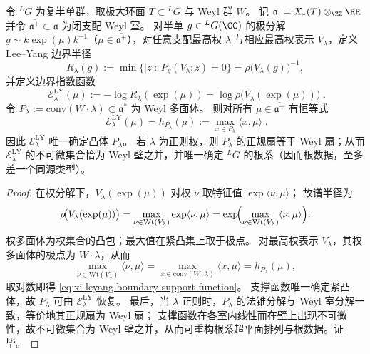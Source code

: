 \begin{theorem}\label{thm:xi-leyang-boundary-support-function-root-system}
令 \({}^{L}G\) 为复半单群，取极大环面 \(T\subset {}^{L}G\) 与 Weyl 群 \(W\)。
记
\(
\mathfrak a:=X_{\ast}(T)\otimes_{\ZZ}\RR
\)
并令 \(\overline{\mathfrak a^{+}}\subset\mathfrak a\) 为闭支配 Weyl 室。
对半单 \(g\in{}^{L}G(\CC)\) 的极分解 \(g\sim k\exp(\mu)k^{-1}\)（\(\mu\in\overline{\mathfrak a^{+}}\)），对任意支配最高权 \(\lambda\) 与相应最高权表示 \(V_{\lambda}\)，定义 Lee--Yang 边界半径
\[
R_{\lambda}(g):=\min\{|z|:\ P_g(V_{\lambda};z)=0\}
=\rho\!\bigl(V_{\lambda}(g)\bigr)^{-1},
\]
并定义边界指数函数
\begin{equation}\label{eq:xi-leyang-boundary-exponent}
\boxed{\;
\mathcal E^{\mathrm{LY}}_{\lambda}(\mu)
:=-\log R_{\lambda}(\exp(\mu))
=\log \rho\!\bigl(V_{\lambda}(\exp(\mu))\bigr)\; }.
\end{equation}
令 \(P_{\lambda}:=\mathrm{conv}(W\cdot \lambda)\subset \mathfrak a^{\ast}\) 为 Weyl 多面体。
则对所有 \(\mu\in\overline{\mathfrak a^{+}}\) 有恒等式
\begin{equation}\label{eq:xi-leyang-boundary-support-function}
\boxed{\;
\mathcal E^{\mathrm{LY}}_{\lambda}(\mu)=h_{P_{\lambda}}(\mu)
:=\max_{x\in P_{\lambda}}\langle x,\mu\rangle\; }.
\end{equation}
因此 \(\mathcal E^{\mathrm{LY}}_{\lambda}\) 唯一确定凸体 \(P_{\lambda}\)。
若 \(\lambda\) 为正则权，则 \(P_{\lambda}\) 的正规扇等于 Weyl 扇；从而 \(\mathcal E^{\mathrm{LY}}_{\lambda}\) 的不可微集合恰为 Weyl 壁之并，并唯一确定 \({}^{L}G\) 的根系（因而根数据，至多差一个同源类型）。
\end{theorem}
\begin{proof}
在权分解下，\(V_{\lambda}(\exp(\mu))\) 对权 \(\nu\) 取特征值 \(\exp\langle \nu,\mu\rangle\)；
故谱半径为
\[
\rho\!\bigl(V_{\lambda}(\exp(\mu))\bigr)
=\max_{\nu\in\mathrm{Wt}(V_{\lambda})}\exp\langle\nu,\mu\rangle
=\exp\!\Bigl(\max_{\nu\in\mathrm{Wt}(V_{\lambda})}\langle\nu,\mu\rangle\Bigr).
\]
权多面体为权集合的凸包；最大值在紧凸集上取于极点。
对最高权表示 \(V_{\lambda}\)，其权多面体的极点为 \(W\cdot\lambda\)，从而
\[
\max_{\nu\in\mathrm{Wt}(V_{\lambda})}\langle\nu,\mu\rangle
=\max_{x\in\mathrm{conv}(W\cdot\lambda)}\langle x,\mu\rangle
=h_{P_{\lambda}}(\mu),
\]
取对数即得 \eqref{eq:xi-leyang-boundary-support-function}。
支撑函数唯一确定紧凸体，故 \(P_{\lambda}\) 可由 \(\mathcal E^{\mathrm{LY}}_{\lambda}\) 恢复。
最后，当 \(\lambda\) 正则时，\(P_{\lambda}\) 的法锥分解与 Weyl 室分解一致，等价地其正规扇为 Weyl 扇；
支撑函数在各室内线性而在壁上出现不可微性，故不可微集合为 Weyl 壁之并，从而可重构根系超平面排列与根数据。证毕。
\end{proof}

\endinput

